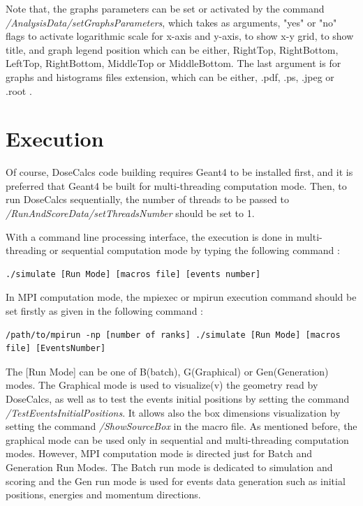 \documentclass[letterpaper,12pt]{article}
\begin{document}
Note that, the graphs parameters can be set or activated by the command \textit{/AnalysisData/setGraphsParameters}, which takes as arguments, "yes" or "no" flags to activate logarithmic scale for x-axis and y-axis, to show x-y grid, to show title, and graph legend position which can be either, RightTop, RightBottom, LeftTop, RightBottom, MiddleTop or MiddleBottom. The last argument is for graphs and histograms files extension, which can be either, .pdf, .ps, .jpeg or .root .

\section{ Execution } 

Of course, DoseCalcs code building requires Geant4 to be installed first, and it is preferred that Geant4 be built for multi-threading computation mode. Then, to run DoseCalcs sequentially, the number of threads to be passed to \textit{/RunAndScoreData/setThreadsNumber} should be set to 1.

With a command line processing interface, the execution is done in multi-threading or sequential computation mode by typing the following command :
\begin{lstlisting}
./simulate [Run Mode] [macros file] [events number]
\end{lstlisting}

In MPI computation mode, the mpiexec or mpirun execution command should be set firstly as given in the following command :
\begin{lstlisting}
/path/to/mpirun -np [number of ranks] ./simulate [Run Mode] [macros file] [EventsNumber]
\end{lstlisting}

The [Run Mode] can be one of B(batch), G(Graphical) or Gen(Generation) modes. The Graphical mode is used to visualize(v) the geometry read by DoseCalcs, as well as to test the events initial positions by setting the command \textit{/TestEventsInitialPositions}. It allows also the box dimensions visualization by setting the command \textit{/ShowSourceBox} in the macro file. As mentioned before, the graphical mode can be used only in sequential and multi-threading computation modes. However, MPI computation mode is directed just for Batch and Generation Run Modes. The Batch run mode is dedicated to simulation and scoring and the Gen run mode is used for events data generation such as initial positions, energies and momentum directions. 
\end{document}
